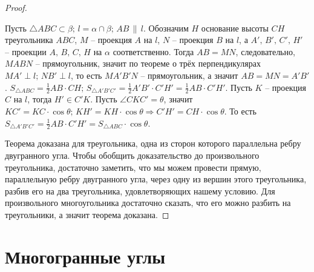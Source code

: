 \documentclass[12pt]{article}
\theoremstyle{definition}
\begin{document}
\begin{proof}
\begin{center}
    \end{center}
    Пусть $\triangle ABC\subset\beta;\,l=\alpha\cap\beta;\,AB\,\|\,l$. Обозначим $H$ основание высоты $CH$ треугольника $ABC$, $M$ – проекция $A$ на $l$, $N$ – проекция $B$ на $l$, а $A',\,B',\,C',\,H'$ – проекции $A,\,B,\,C,\,H$ на $\alpha$ соответственно. Тогда $AB=MN$, следовательно, $MABN$ – прямоугольник, значит по теореме о трёх перпендикулярах $MA'\perp l;\,NB'\perp l$, то есть $MA'B'N$ – прямоугольник, а значит $AB=MN=A'B'$. $S_{\triangle ABC}=\frac{1}{2}AB\cdot CH;\,S_{\triangle A'B'C'}=\frac{1}{2}A'B'\cdot C'H'=\frac{1}{2}AB\cdot C'H'$. Пусть $K$ – проекция $C$ на $l$, тогда $H'\in C'K$. Пусть $\angle CKC'=\theta$, значит $KC'=KC\cdot\cos\theta;\,KH'=KH\cdot\cos\theta\Longrightarrow C'H'=CH\cdot\cos\theta$. То есть $S_{\triangle A'B'C'}=\frac{1}{2}AB\cdot C'H'=S_{\triangle ABC}\cdot\cos\theta$.\bigskip

    Теорема доказана для треугольника, одна из сторон которого параллельна ребру двугранного угла. Чтобы обобщить доказательство до произвольного треугольника, достаточно заметить, что мы можем провести прямую, параллельную ребру двугранного угла, через одну из вершин этого треугольника, разбив его на два треугольника, удовлетворяющих нашему условию. Для произвольного многоугольника достаточно сказать, что его можно разбить на треугольники, а значит теорема доказана.
\end{proof}

\section{Многогранные углы}
\end{document}
